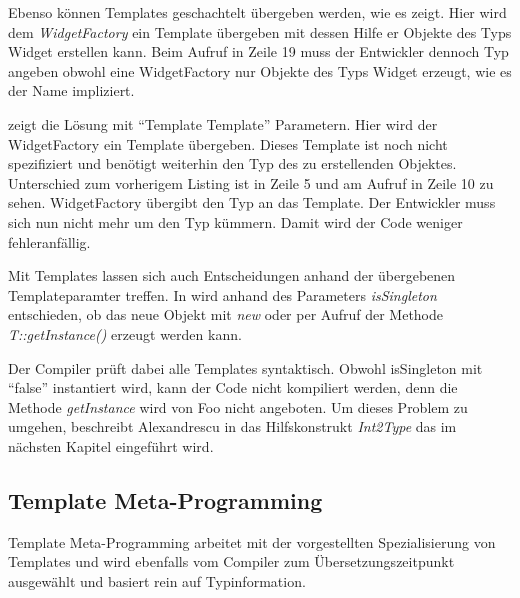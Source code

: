 

Ebenso können Templates geschachtelt übergeben werden, wie es  zeigt. Hier wird dem \emph{WidgetFactory} ein Template übergeben mit dessen Hilfe er Objekte des Typs Widget erstellen kann. Beim Aufruf in Zeile 19 muss der Entwickler dennoch Typ angeben obwohl eine WidgetFactory nur Objekte des Typs Widget erzeugt, wie es der Name impliziert.



 zeigt die Lösung mit ``Template Template'' Parametern. Hier wird der WidgetFactory ein Template übergeben. Dieses Template ist noch nicht spezifiziert und benötigt weiterhin den Typ des zu erstellenden Objektes. Unterschied zum vorherigem Listing ist in Zeile 5 und am Aufruf in Zeile 10 zu sehen. WidgetFactory übergibt den Typ an das Template. Der Entwickler muss sich nun nicht mehr um den Typ kümmern. Damit wird der Code weniger fehleranfällig.



Mit Templates lassen sich auch Entscheidungen anhand der übergebenen Templateparamter treffen. In  wird anhand des Parameters \emph{isSingleton} entschieden, ob das neue Objekt mit \emph{new} oder per Aufruf der Methode \emph{T::getInstance()} erzeugt werden kann.



Der Compiler prüft dabei alle Templates syntaktisch. Obwohl isSingleton mit ``false'' instantiert wird, kann der Code nicht kompiliert werden, denn die Methode \emph{getInstance} wird von Foo nicht angeboten. Um dieses Problem zu umgehen, beschreibt Alexandrescu in \cite{Alexandrescu2001Modern} das Hilfskonstrukt \emph{Int2Type} das im nächsten Kapitel eingeführt wird.

\subsection{Template Meta-Programming}
Template Meta-Programming arbeitet mit der vorgestellten Spezialisierung von Templates und wird ebenfalls vom Compiler zum Übersetzungszeitpunkt ausgewählt und basiert rein auf Typinformation.

